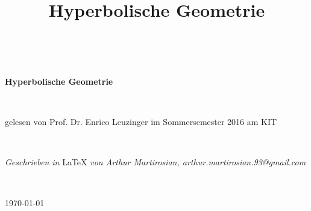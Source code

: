 \documentclass[11pt]{book}
\title{Hyperbolische Geometrie}
\numberwithin{dummy}{section}
\theoremstyle{nonumberbreak}
\begin{document}
\begin{titlepage}

\textrm{ }\\[64pt]

\begin{center}
{\fontsize{32}{32} \selectfont \textbf{Hyperbolische Geometrie}}
\end{center}
\textrm{ } \\[36pt]
\begin{center} \large{\textrm{gelesen von Prof. Dr. Enrico Leuzinger im Sommersemester 2016 am KIT}} \end{center}
\textrm{ } \\[320pt]
\begin{center} \large{\textit{Geschrieben in } \LaTeX \textit{ von Arthur Martirosian, arthur.martirosian.93@gmail.com}}\end{center}
\textrm{ }\\[24pt]
\begin{center} \large{\today} \end{center}

\end{titlepage}
\thispagestyle{empty}



\begin{spacing}{1.6}
\setcounter{tocdepth}{2}
\tableofcontents
\thispagestyle{empty}
\end{spacing}
\newpage
\end{document}
